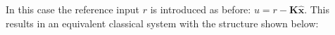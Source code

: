 In this case the reference input $r$ is introduced as before: $u=r-\mathbf{K}\hat{\mathbf{x}}$.  This results in 
an equivalent classical system with the structure shown below:
\begin{center}
\end{center}
\endinput

